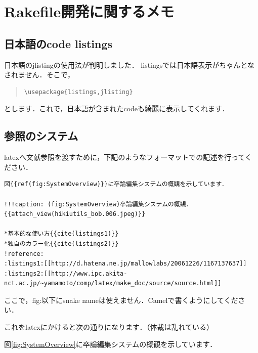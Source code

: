 \section{Rakefile開発に関するメモ}
\subsection{日本語のcode listings}
日本語のjlistingの使用法が判明しました．
listingsでは日本語表示がちゃんとなされません．そこで，
\begin{quote}\begin{verbatim}
\usepackage{listings,jlisting}
\end{verbatim}\end{quote}
とします．これで，日本語が含まれたcodeも綺麗に表示してくれます．

\subsection{参照のシステム}
latexへ文献参照を渡すために，下記のようなフォーマットでの記述を行ってください．
\begin{lstlisting}[style=customCsh,basicstyle={\scriptsize\ttfamily}]
図{{ref(fig:SystemOverview)}}に卒論編集システムの概観を示しています．

!!!caption: (fig:SystemOverview)卒論編集システムの概観．
{{attach_view(hikiutils_bob.006.jpeg)}}

*基本的な使い方{{cite(listings1)}}
*独自のカラー化{{cite(listings2)}}
!reference:
:listings1:[[http://d.hatena.ne.jp/mallowlabs/20061226/1167137637]]
:listings2:[[http://www.ipc.akita-nct.ac.jp/~yamamoto/comp/latex/make_doc/source/source.html]]
\end{lstlisting}
ここで，fig:以下にsnake nameは使えません．Camelで書くようにしてください．

これをlatexにかけると次の通りになります．（体裁は乱れている）

図\ref{fig:SystemOverview}に卒論編集システムの概観を示しています．

